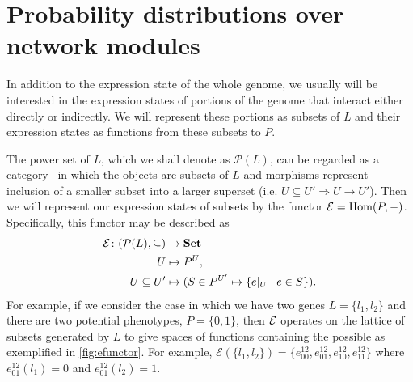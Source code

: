 \section{Probability distributions over network modules}

In addition to the expression state of the whole genome, we usually will be interested in the expression states of portions of the genome that interact either directly or indirectly.  We will represent these portions as subsets of $L$ and their expression states as functions from these subsets to $P$.

The power set of $L$, which we shall denote as $\mathcal{P}(L)$, can be regarded  as a category~\cite{Lane1998,MacLane1992,Awodey2006} in which the objects are subsets of $L$ and morphisms represent inclusion of a smaller subset into a larger superset (i.e. $U \subseteq U' \Rightarrow U \rightarrow U'$).  Then we will represent our expression states of subsets by the functor $\mathcal{E} = \mathrm{Hom}(P,-)$.  Specifically, this functor may be described as
\begin{equation}\label{eq:gpfunctor}
\begin{split}
\expr \colon (\mathcal{P}(L), \subseteq) &\to \mathbf{Set} \\
U &\mapsto P^U,\\
U \subseteq U' &\mapsto (S \in P^{U'} \mapsto \{e|_U \mid e \in S\}). %
\end{split}
\end{equation}
For example, if we consider the case in which we have two genes $L=\{l_1,l_2\}$ and there are two potential phenotypes, $P=\{0,1\}$, then $\mathcal{E}$ operates on the lattice of subsets generated by $L$ to give spaces of functions containing the possible \gnpm{} as exemplified in \ref{fig:efunctor}. For example, $\mathcal{E}(\{l_1,l_2\}) = \{ e^{12}_{00},e^{12}_{01},e^{12}_{10},e^{12}_{11} \}$ where $e^{12}_{01}(l_1) = 0$ and $e^{12}_{01}(l_2) = 1$.

